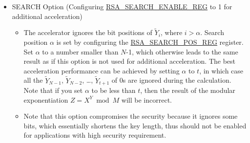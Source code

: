 \documentclass[main\_\_EN.tex]{subfiles}
\begin{document}
\begin{itemize}
 \item SEARCH Option (Configuring \hyperref[regdesc:RSASEARCHENABLEREG]{RSA\_SEARCH\_ENABLE\_REG} to 1 for additional acceleration)
    \begin{itemize}
        \item The accelerator ignores the bit positions of \begin{math} \widetilde{Y}_{i} \end{math}, where \begin{math} i > \alpha \end{math}. Search position \begin{math} \alpha \end{math} is set by configuring the \hyperref[regdesc:RSASEARCHPOSREG]{RSA\_SEARCH\_POS\_REG} register. Set \begin{math} \alpha \end{math} to a number smaller than \begin{math}N\end{math}-1, which otherwise leads to the same result as if this option is not used for additional acceleration. The best acceleration performance can be achieved by setting \begin{math} \alpha \end{math} to \begin{math} t \end{math}, in which case all the \begin{math}\widetilde{Y}_{N-1}\end{math}, \begin{math}\widetilde{Y}_{N-2}\end{math}, \dots, \begin{math}\widetilde{Y}_{t+1}\end{math} of 0s are ignored during the calculation. Note that if you set \begin{math} \alpha \end{math} to be less than \begin{math} t \end{math}, then the result of the modular exponentiation \begin{math}Z = X^{Y} \bmod M \end{math} will be incorrect.
    \item Note that this option compromises the security because it ignores some bits, which essentially shortens the key length, thus should not be enabled for applications with high security requirement.
    \end{itemize}  


\end{itemize}
\end{document}
